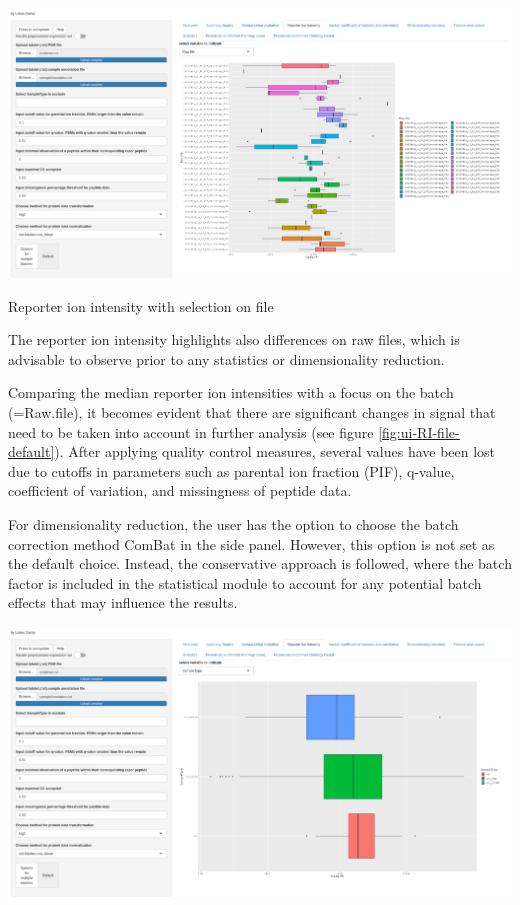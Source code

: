 \documentclass[
  11pt,
]{article}
\let\origfigure\figure
\begin{document}
\newpage
\bgroup  \origfigure[H] 

{\centering \includegraphics[width=1\linewidth]{screenshots/RI_file_default} 

}

\caption{Reporter ion intensity with selection on file}\label{fig:ui-RI-file-default}
 \endfigure\egroup

The reporter ion intensity highlights also differences on raw files, which is advisable to observe prior to any statistics or dimensionality reduction.

Comparing the median reporter ion intensities with a focus on the batch (=Raw.file), it becomes evident that there are significant changes in signal that need to be taken into account in further analysis (see figure \ref{fig:ui-RI-file-default}). After applying quality control measures, several values have been lost due to cutoffs in parameters such as parental ion fraction (PIF), q-value, coefficient of variation, and missingness of peptide data.

For dimensionality reduction, the user has the option to choose the batch correction method ComBat \citep{Leek2012} in the side panel. However, this option is not set as the default choice. Instead, the conservative approach is followed, where the batch factor is included in the statistical module to account for any potential batch effects that may influence the results.

\newpage
\bgroup  \origfigure[H] 

{\centering \includegraphics[width=1\linewidth]{screenshots/RI_st_default} 

}
\end{document}
